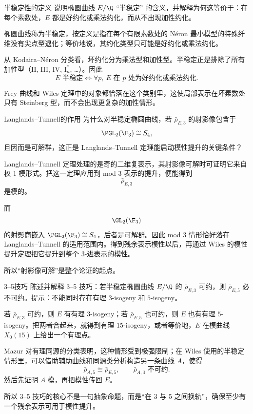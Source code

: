 \begin{problem}{半稳定性的定义}
说明椭圆曲线 $E/\Q$ ``半稳定'' 的含义，并解释为何这等价于：在每个素数处，$E$ 都是好约化或乘法约化，而从不出现加性约化。
\end{problem}
\begin{solution}
椭圆曲线称为半稳定，按定义是指在每个有限素数处的 Néron 最小模型的特殊纤维没有尖点型退化；等价地说，其约化类型只可能是好约化或乘法约化。

从 Kodaira--Néron 分类看，坏约化分为乘法型和加性型。半稳定正是排除了所有加性型（II, III, IV, $\mathrm{I}_n^*$, \dots）。因此
\[
E\text{ 半稳定}
\iff
\forall p,\ E\text{ 在 }p\text{ 处为好约化或乘法约化}.
\]

Frey 曲线和 Wiles 定理中的对象都恰落在这个类别里，这使局部表示在坏素数处只有 Steinberg 型，而不会出现更复杂的加性情形。
\end{solution}

\begin{problem}{Langlands--Tunnell的作用}
为什么对半稳定椭圆曲线，若 $\bar\rho_{E,3}$ 的射影像包含于
\[
\PGL_2(\F_3)\cong S_4,
\]
且因而是可解群，这正是 Langlands--Tunnell 定理能启动模性提升的关键条件？
\end{problem}
\begin{solution}
Langlands--Tunnell 定理处理的是奇的二维复表示，其射影像可解时可证明它来自权 $1$ 模形式。把这一定理应用到 mod $3$ 表示的提升，便能得到
\[
\bar\rho_{E,3}
\]
是模的。

而
\[
\GL_2(\F_3)
\]
的射影商嵌入 $\PGL_2(\F_3)\cong S_4$，后者是可解群。因此 mod $3$ 情形恰好落在 Langlands--Tunnell 的适用范围内。得到残余表示模性以后，再通过 Wiles 的模性提升定理把它提升到整个 $3$-进表示的模性。

所以“射影像可解”是整个论证的起点。
\end{solution}

\begin{problem}{3--5技巧}
陈述并解释 3--5 技巧：若半稳定椭圆曲线 $E/\Q$ 的 $\bar\rho_{E,3}$ 可约，则 $\bar\rho_{E,5}$ 必不可约。提示：不能同时存在有理 $3$-isogeny 和 $5$-isogeny。
\end{problem}
\begin{solution}
若 $\bar\rho_{E,3}$ 可约，则 $E$ 有有理 $3$-isogeny；若 $\bar\rho_{E,5}$ 也可约，则 $E$ 也有有理 $5$-isogeny。把两者合起来，就得到有理 $15$-isogeny，或者等价地，$E$ 在模曲线 $X_0(15)$ 上给出一个有理点。

Mazur 对有理同源的分类表明，这种情形受到极强限制；在 Wiles 使用的半稳定情形里，可以借助辅助曲线和同源类分析构造另一条曲线 $A$，使得
\[
\bar\rho_{A,5}\cong \bar\rho_{E,5},
\qquad
\bar\rho_{A,3}\text{ 不可约}.
\]
然后先证明 $A$ 模，再把模性传回 $E$。

所以 3--5 技巧的核心不是一句抽象命题，而是“在 3 与 5 之间换轨”，确保至少有一个残余表示可用于模性提升。
\end{solution}

